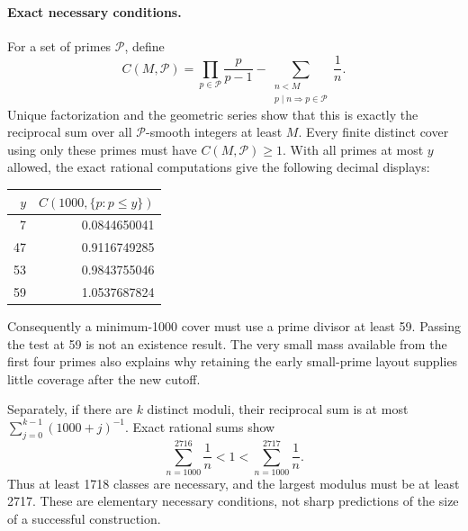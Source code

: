 \documentclass[11pt]{article}
\begin{document}
\paragraph{Exact necessary conditions.}
For a set of primes $\mathcal P$, define
\[
 C(M,\mathcal P)=
 \prod_{p\in\mathcal P}\frac{p}{p-1}
 -\sum_{\substack{n<M\\p\mid n\Rightarrow p\in\mathcal P}}\frac1n.
\]
Unique factorization and the geometric series show that this is exactly
the reciprocal sum over all $\mathcal P$-smooth integers at least $M$.
Every finite distinct cover using only these primes must have
$C(M,\mathcal P)\geq1$. With all primes at most $y$ allowed, the exact
rational computations give the following decimal displays:
\begin{center}
\begin{tabular}{rr}
\toprule
$y$ & $C(1000,\{p:p\leq y\})$\\
\midrule
7 & 0.0844650041\\
47 & 0.9116749285\\
53 & 0.9843755046\\
59 & 1.0537687824\\
\bottomrule
\end{tabular}
\end{center}
Consequently a minimum-1000 cover must use a prime divisor at least 59.
Passing the test at 59 is not an existence result. The very small mass
available from the first four primes also explains why retaining the
early small-prime layout supplies little coverage after the new cutoff.

Separately, if there are $k$ distinct moduli, their reciprocal sum is at
most $\sum_{j=0}^{k-1}(1000+j)^{-1}$. Exact rational sums show
\[
 \sum_{n=1000}^{2716}\frac1n<1
 <\sum_{n=1000}^{2717}\frac1n.
\]
Thus at least 1718 classes are necessary, and the largest modulus must
be at least 2717. These are elementary necessary conditions, not sharp
predictions of the size of a successful construction.
\end{document}
